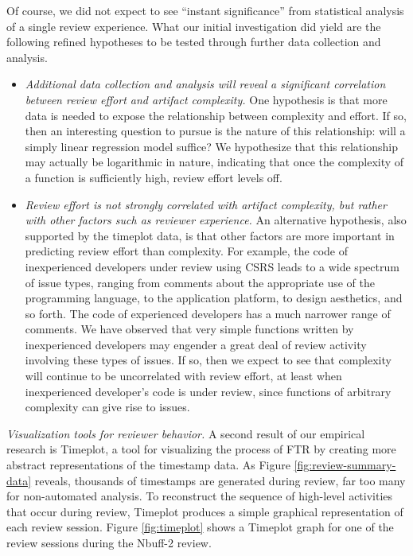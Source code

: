 \begin{itemizenoindent}
  Of course, we did not expect to see ``instant significance'' from
  statistical analysis of a single review experience.  What our initial
  investigation did yield are the following refined hypotheses to be
  tested through further data collection and analysis.

\begin{itemize}
\item {\em Additional data collection and analysis will reveal a
  significant correlation between review effort and artifact complexity.}
  One hypothesis is that more data is needed to expose the relationship
  between complexity and effort.  If so, then an interesting question to
  pursue is the nature of this relationship: will a simply linear
  regression model suffice?  We hypothesize that this relationship may
  actually be logarithmic in nature, indicating that once the complexity of
  a function is sufficiently high, review effort levels off.
  
\item {\em Review effort is not strongly correlated with artifact
  complexity, but rather with other factors such as reviewer experience.}
  An alternative hypothesis, also supported by the timeplot data, is that
  other factors are more important in predicting review effort than
  complexity.  For example, the code of inexperienced developers under
  review using CSRS leads to a wide spectrum of issue types, ranging from
  comments about the appropriate use of the programming language, to the
  application platform, to design aesthetics, and so forth.  The code of
  experienced developers has a much narrower range of comments.  We have
  observed that very simple functions written by inexperienced developers
  may engender a great deal of review activity involving these types of
  issues.  If so, then we expect to see that complexity will continue to be
  uncorrelated with review effort, at least when inexperienced developer's
  code is under review, since functions of arbitrary complexity can give
  rise to issues.
\end{itemize}

\item {\em Visualization tools for reviewer behavior.} A second result of our
empirical research is Timeplot, a tool for visualizing the process of FTR by
creating more abstract representations of the timestamp data.  As Figure
\ref{fig:review-summary-data} 
reveals, thousands of timestamps are generated during review, far too many
for non-automated analysis. To reconstruct the sequence of high-level
activities that occur during review, Timeplot produces a simple graphical
representation of each review session.  Figure \ref{fig:timeplot}  shows a Timeplot graph for one of the review
sessions during the Nbuff-2 review.


\end{itemizenoindent}
